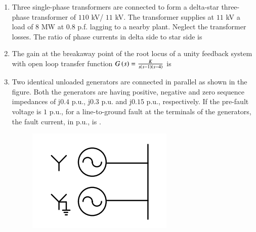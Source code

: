 \documentclass[journal,12pt,onecolumn]{IEEEtran}
\theoremstyle{remark}
\begin{document}
\begin{enumerate}[start=1, label=Q.\arabic*]
    \hfill{}

    \item Three single-phase transformers are connected to form a delta-star three-phase transformer of $110$ kV/ $11$ kV. The transformer supplies at $11$ kV a load of $8$ MW at $0.8$ p.f. lagging to a nearby plant. Neglect the transformer losses. The ratio of phase currents in delta side to star side is
    \begin{enumerate}
    \end{enumerate}

    \hfill{}

    \item The gain at the breakaway point of the root locus of a unity feedback system with open loop transfer function $G\left(s\right) = \frac{K}{s\left(s-1\right)\left(s-4\right)}$ is
    \begin{enumerate}
    \end{enumerate}

    \hfill{}

    \item Two identical unloaded generators are connected in parallel as shown in the figure. Both the generators are having positive, negative and zero sequence impedances of j$0.4$ p.u., j$0.3$ p.u. and j$0.15$ p.u., respectively. If the pre-fault voltage is $1$ p.u., for a line-to-ground  fault at the terminals of the generators, the fault current, in p.u., is \underline{\hspace{2cm}}.
    \begin{figure}[H]
        \includegraphics[width=0.6\columnwidth]{Figures/2q53.png}
        \centering
        \caption{}
    \end{figure}


\end{enumerate}
\end{document}
